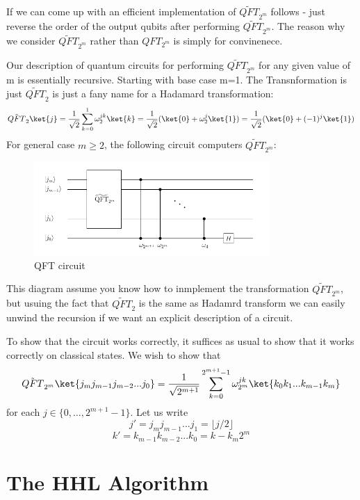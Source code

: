 \documentclass[12pt, oneside]{book}
\theoremstyle{definition}
\theoremstyle{definition}
\theoremstyle{remark}
\begin{document}
If we can come up with an efficient implementation of $\tilde{QFT}_{2^m}$ follows - just reverse the order of the output qubits after performing $\tilde{QFT}_{2^m}$.
The reason why we consider $\tilde{QFT}_{2^m}$ rather than $QFT_{2^m}$ is simply for convinenece.

Our description of quantum circuits for performing $\tilde{QFT}_{2^m}$ for any given value of m is essentially recursive. Starting with base case m=1. The Transnformation is just
$\tilde{QFT}_2$ is just a fany name for a Hadamard transformation:
\[
\tilde{QFT}_2\ket{j}=\frac{1}{\sqrt{2}}\sum_{k=0}^1\omega_2^{jk}\ket{k}=\frac{1}{\sqrt{2}}(\ket{0}+\omega_2^j\ket{1})=\frac{1}{\sqrt{2}}(\ket{0}+(-1)^j\ket{1})
\]
For general case $m\geq 2$, the following circuit computers $\tilde{QFT}_{2^m}$:
\begin{figure}[H]
    \centering
    \includegraphics[width=0.8\textwidth]{../images/qft_3.png}
    \caption{QFT circuit}
    \label{fig:qft_3}
\end{figure}

This diagram assume you know how to inmplement the transformation $\tilde{QFT}_{2^m}$, but usuing the fact that $\tilde{QFT}_2$ is the same 
as Hadamrd transform we can easily unwind the recursion if we want an explicit description of a circuit.

To show that the circuit works correctly, it suffices as usual to show that it works correctly on classical states. We
wish to show that 
\[
\tilde{QFT}_{2^m}\ket{j_mj_{m-1}j_{m-2}...j_0}=\frac{1}{\sqrt{2^{m+1}}}\sum_{k=0}^{2^{m+1}-1}\omega_{2^m}^{jk}\ket{k_0k_1...k_{m-1}k_m}
\]
for each $j \in \{0,\ldots,2^{m+1}-1\}$. Let us write
\[
j'=j_mj_{m-1}...j_1=\lfloor j/2\rfloor 
\]
\[
k'=k_{m-1}k_{m-2}...k_0=k-k_m2^m
\]

\chapter{The HHL Algorithm}
\end{document}

